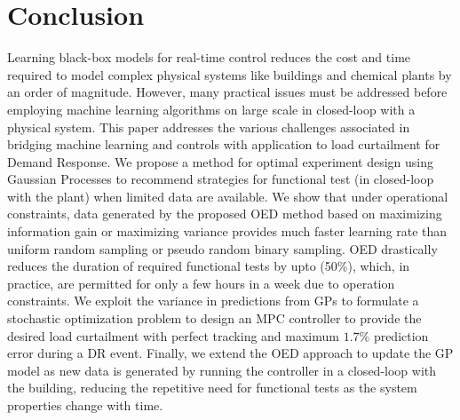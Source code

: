 \section{Conclusion}

Learning black-box models for real-time control reduces the cost and time required to model complex physical systems like buildings and chemical plants by an order of magnitude. 
However, many practical issues must be addressed before employing machine learning algorithms on large scale in closed-loop with a physical system.
This paper addresses the various challenges associated in bridging machine learning and controls with application to load curtailment for Demand Response.
We propose a method for optimal experiment design using Gaussian Processes to recommend strategies for functional test (in closed-loop with the plant) when limited data are available. 
We show that under operational constraints, data generated by the proposed OED method based on maximizing information gain or maximizing variance provides much faster learning rate than uniform random sampling or pseudo random binary sampling. 
OED drastically reduces the duration of required functional tests by upto (50\%), which, in practice, are permitted for only a few hours in a week due to operation constraints.
We exploit the variance in predictions from GPs to formulate a stochastic optimization problem to design an MPC controller to provide the desired load curtailment with perfect tracking and maximum \(1.7\%\) prediction error during a DR event. 
Finally, we extend the OED approach to update the GP model as new data is generated by running the controller in a closed-loop with the building, reducing the repetitive need for functional tests as the system properties change with time.

